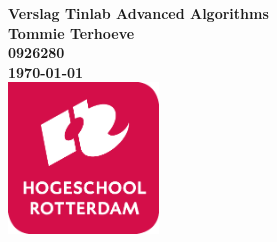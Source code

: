 \documentclass{article}
\begin{document}
\sffamily
\begin{titlepage}
  \centering
    \vfill
    {\bfseries\Huge
      Verslag Tinlab Advanced Algorithms \\
        \vskip2cm
      }
      {\bfseries\Large
        Tommie Terhoeve\\
      }
      {
        \bfseries\normalsize
        0926280\\
        \vskip1cm
        \today\\
    }    
    \vfill
    \includegraphics[width=4cm]{logohr.png} %
    \vfill
    \vfill
\end{titlepage}
\newpage
\tableofcontents

\newpage


\newpage

\newpage


\newpage

\newpage


\end{document}

